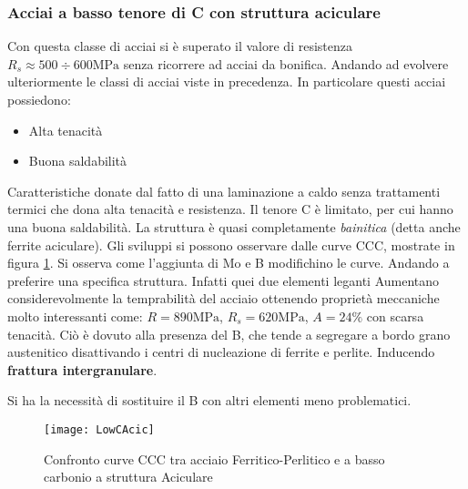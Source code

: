 \subsubsection{Acciai a basso tenore di C con struttura aciculare}
Con questa classe di acciai si è superato il valore di resistenza $R_s \approx 500 \div 600\unit{\MPa}$
senza ricorrere ad acciai da bonifica. Andando ad evolvere ulteriormente le classi
di acciai viste in precedenza.
In particolare questi acciai possiedono:
\begin{itemize}
\item Alta tenacità
\item Buona saldabilità
\end{itemize}
Caratteristiche donate dal fatto di una laminazione a caldo senza trattamenti termici che dona
alta tenacità e resistenza. Il tenore C è limitato, per cui hanno una buona saldabilità.
La struttura è quasi completamente \textit{bainitica}  (detta anche ferrite aciculare). 
Gli sviluppi si possono osservare dalle curve CCC, mostrate in figura \ref{fig:ConfFer-Per/LowC}.
Si osserva come l'aggiunta di Mo e B modifichino le curve. Andando a preferire una 
specifica struttura.
Infatti quei due elementi leganti Aumentano considerevolmente la temprabilità del acciaio ottenendo
proprietà meccaniche molto interessanti come: $R = 890\unit{\MPa}$, $R_s = 620\unit{\MPa}$, $A = 24\%$
con scarsa tenacità.
Ciò è dovuto alla presenza del B, che tende a segregare a bordo grano austenitico disattivando i centri 
di nucleazione di ferrite e perlite. Inducendo \textbf{frattura intergranulare}.

Si ha la necessità di sostituire il B con altri elementi meno problematici.

\begin{figure}
\centering
\texttt{[image: LowCAcic]}
\caption{Confronto curve CCC tra acciaio Ferritico-Perlitico e a basso carbonio a struttura Aciculare}
\label{fig:ConfFer-Per/LowC}
\end{figure}